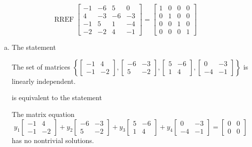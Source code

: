 \begin{exerciseAnswer} 


\[\operatorname{RREF} \left[\begin{array}{cccc}
-1 & -6 & 5 & 0 \\
4 & -3 & -6 & -3 \\
-1 & 5 & 1 & -4 \\
-2 & -2 & 4 & -1
\end{array}\right] = \left[\begin{array}{cccc}
1 & 0 & 0 & 0 \\
0 & 1 & 0 & 0 \\
0 & 0 & 1 & 0 \\
0 & 0 & 0 & 1
\end{array}\right] \]


\begin{enumerate}[(a)]
\item The statement 
\begin{center}\begin{minipage}{0.8\textwidth}
 The set of matrices \( \left\{ \left[\begin{array}{cc}
-1 & 4 \\
-1 & -2
\end{array}\right] , \left[\begin{array}{cc}
-6 & -3 \\
5 & -2
\end{array}\right] , \left[\begin{array}{cc}
5 & -6 \\
1 & 4
\end{array}\right] , \left[\begin{array}{cc}
0 & -3 \\
-4 & -1
\end{array}\right] \right\} \) is linearly independent.
\end{minipage}\end{center}
     is equivalent to the statement 
\begin{center}\begin{minipage}{0.8\textwidth}
 The matrix equation \[ y_{1} \left[\begin{array}{cc}
-1 & 4 \\
-1 & -2
\end{array}\right] + y_{2} \left[\begin{array}{cc}
-6 & -3 \\
5 & -2
\end{array}\right] + y_{3} \left[\begin{array}{cc}
5 & -6 \\
1 & 4
\end{array}\right] + y_{4} \left[\begin{array}{cc}
0 & -3 \\
-4 & -1
\end{array}\right] = \left[\begin{array}{cc}
0 & 0 \\
0 & 0
\end{array}\right] \] has no nontrivial solutions. 
\end{minipage}\end{center}
    

\end{enumerate}
\end{exerciseAnswer}
